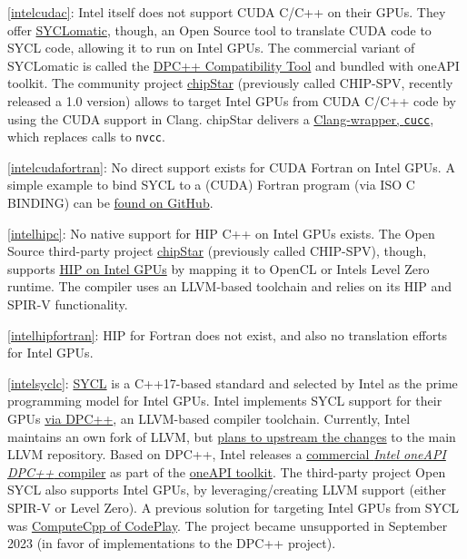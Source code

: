 \item \ref{intelcudac}: Intel itself does not support CUDA C/C++ on their GPUs. They offer \href{https://github.com/oneapi-src/SYCLomatic}{SYCLomatic}, though, an Open Source tool to translate CUDA code to SYCL code, allowing it to run on Intel GPUs. The commercial variant of SYCLomatic is called the \href{https://www.intel.com/content/www/us/en/developer/tools/oneapi/dpc-compatibility-tool.html}{DPC++ Compatibility Tool} and bundled with oneAPI toolkit. The community project \href{https://github.com/CHIP-SPV/chipStar}{chipStar} (previously called CHIP-SPV, recently released a 1.0 version) allows to target Intel GPUs from CUDA C/C++ code by using the CUDA support in Clang. chipStar delivers a \href{https://github.com/CHIP-SPV/chipStar/blob/main/docs/Using.md\#compiling-cuda-application-directly-with-chipstar}{Clang-wrapper, \texttt{cucc}}, which replaces calls to \texttt{nvcc}.
\item \ref{intelcudafortran}: No direct support exists for CUDA Fortran on Intel GPUs. A simple example to bind SYCL to a (CUDA) Fortran program (via ISO C BINDING) can be \href{https://github.com/codeplaysoftware/SYCL-For-CUDA-Examples/tree/master/examples/fortran_interface}{found on GitHub}.
\item \ref{intelhipc}: No native support for HIP C++ on Intel GPUs exists. The Open Source third-party project \href{https://github.com/CHIP-SPV/chipStar}{chipStar} (previously called CHIP-SPV), though, supports \href{https://github.com/CHIP-SPV/chipStar/blob/main/docs/Using.md\#compiling-a-hip-application-using-chipstar}{HIP on Intel GPUs} by mapping it to OpenCL or Intel\textquotesingle s Level Zero runtime. The compiler uses an LLVM-based toolchain and relies on its HIP and SPIR-V functionality.
\item \ref{intelhipfortran}: HIP for Fortran does not exist, and also no translation efforts for Intel GPUs.
\item \ref{intelsyclc}: \href{https://www.khronos.org/sycl/}{SYCL} is a C++17-based standard and selected by Intel as the prime programming model for Intel GPUs. Intel implements SYCL support for their GPUs \href{https://github.com/intel/llvm}{via DPC++}, an LLVM-based compiler toolchain. Currently, Intel maintains an own fork of LLVM, but \href{https://lists.llvm.org/pipermail/cfe-dev/2019-January/060811.html}{plans to upstream the changes} to the main LLVM repository. Based on DPC++, Intel releases a \href{https://www.intel.com/content/www/us/en/developer/tools/oneapi/dpc-compiler.html}{commercial \emph{Intel oneAPI DPC++} compiler} as part of the \href{https://www.intel.com/content/www/us/en/developer/tools/oneapi/toolkits.html}{oneAPI toolkit}. The third-party project Open SYCL also supports Intel GPUs, by leveraging/creating LLVM support (either SPIR-V or Level Zero). A previous solution for targeting Intel GPUs from SYCL was \href{https://developer.codeplay.com/products/computecpp/ce/home/}{ComputeCpp of CodePlay}. The project became unsupported in September 2023 (in favor of implementations to the DPC++ project).
